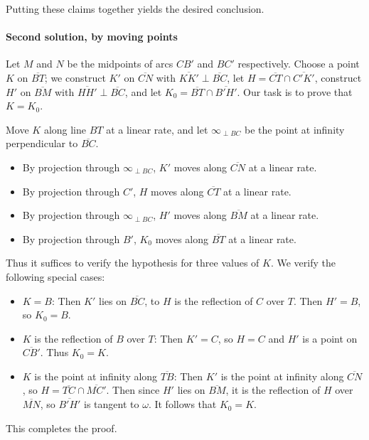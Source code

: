 Putting these claims together yields the desired conclusion.

\paragraph{Second solution, by moving points}     Let $M$ and $N$ be the midpoints of arcs $CB'$ and $BC'$ respectively. Choose a point $K$ on $\overline{BT}$; we construct $K'$ on $\overline{CN}$ with $\overline{KK'}\perp\overline{BC}$, let $H=\overline{CT}\cap\overline{C'K'}$, construct $H'$ on $\overline{BM}$ with $\overline{HH'}\perp\overline{BC}$, and let $K_0=\overline{BT}\cap\overline{B'H'}$. Our task is to prove that $K=K_0$.

Move $K$ along line $BT$ at a linear rate, and let $\infty_{\perp BC}$ be the point at infinity perpendicular to $\overline{BC}$.
\begin{itemize}[itemsep=0em]
    \item By projection through $\infty_{\perp BC}$, $K'$ moves along $\overline{CN}$ at a linear rate.
    \item By projection through $C'$, $H$ moves along $\overline{CT}$ at a linear rate.
    \item By projection through $\infty_{\perp BC}$, $H'$ moves along $\overline{BM}$ at a linear rate.
    \item By projection through $B'$, $K_0$ moves along $\overline{BT}$ at a linear rate.
\end{itemize}
Thus it suffices to verify the hypothesis for three values of $K$. We verify the following special cases:
\begin{itemize}[itemsep=0em]
    \item $K=B$: Then $K'$ lies on $\overline{BC}$, to $H$ is the reflection of $C$ over $T$. Then $H'=B$, so $K_0=B$.
    \item $K$ is the reflection of $B$ over $T$: Then $K'=C$, so $H=C$ and $H'$ is a point on $\overline{CB'}$. Thus $K_0=K$.
    \item $K$ is the point at infinity along $\overline{TB}$: Then $K'$ is the point at infinity along $\overline{CN}$, so $H=\overline{TC}\cap\overline{MC'}$. Then since $H'$ lies on $\overline{BM}$, it is the reflection of $H$ over $\overline{MN}$, so $\overline{B'H'}$ is tangent to $\omega$. It follows that $K_0=K$.
\end{itemize}
This completes the proof.


